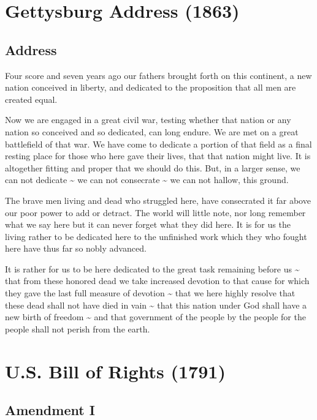 \documentclass[11pt,a4paper]{article}
\begin{document}
\section*{Gettysburg Address (1863)}

\subsection*{Address}

Four score and seven years ago our fathers brought forth on this continent, a new nation conceived in liberty, and dedicated to the proposition that all men are created equal.

Now we are engaged in a great civil war, testing whether that nation or any nation so conceived and so dedicated, can long endure.
We are met on a great battlefield of that war.
We have come to dedicate a portion of that field as a final resting place for those who here gave their lives, that that nation might live.
It is altogether fitting and proper that we should do this.
But, in a larger sense, we can not dedicate \textasciitilde{} we can not consecrate \textasciitilde{} we can not hallow, this ground.

The brave men living and dead who struggled here, have consecrated it far above our poor power to add or detract.
The world will little note, nor long remember what we say here but it can never forget what they did here.
It is for us the living rather to be dedicated here to the unfinished work which they who fought here have thus far so nobly advanced.

It is rather for us to be here dedicated to the great task remaining before us \textasciitilde{} that from these honored dead we take increased devotion to that cause for which they gave the last full measure of devotion \textasciitilde{} that we here highly resolve that these dead shall not have died in vain \textasciitilde{} that this nation under God shall have a new birth of freedom \textasciitilde{} and that government of the people by the people for the people shall not perish from the earth.

\section*{U.S. Bill of Rights (1791)}

\subsection*{Amendment I}
\end{document}
